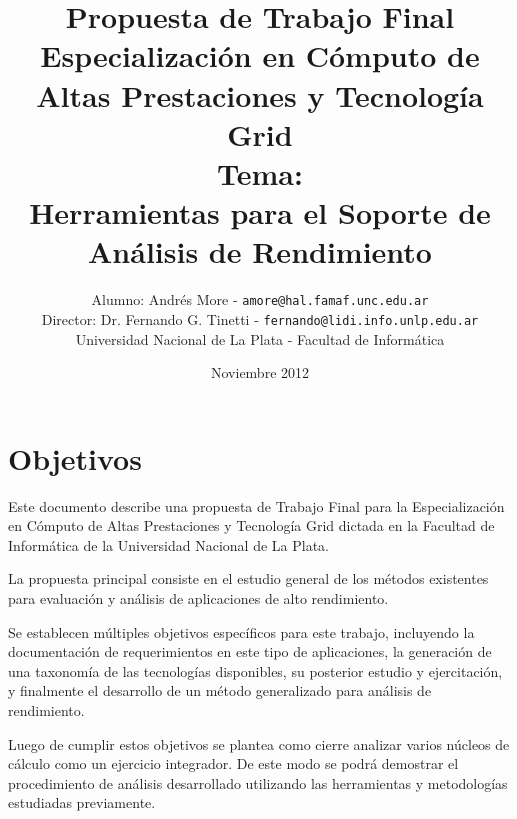 \documentclass[a4paper]{article}
\begin{document}
\title{Propuesta de Trabajo Final\\
\bigskip
Especializaci\'on en C\'omputo de Altas Prestaciones y Tecnolog\'ia Grid\\
\bigskip
Tema:\\
Herramientas para el Soporte de An\'alisis de Rendimiento}

\author{Alumno: Andr\'es More - {\tt amore@hal.famaf.unc.edu.ar}
\\Director: Dr. Fernando G. Tinetti - {\tt fernando@lidi.info.unlp.edu.ar}
\bigskip
\\Universidad Nacional de La Plata - Facultad de Inform\'atica}

\date{Noviembre 2012}

\maketitle

\newpage

\section{Objetivos}

  Este documento describe una propuesta de Trabajo Final para la
  Especializaci\'on en C\'omputo de Altas Prestaciones y Tecnolog\'ia Grid
  dictada en la Facultad de Inform\'atica de la Universidad Nacional de La
  Plata.

  \smallskip

  La propuesta principal consiste en el estudio general de los m\'etodos
  existentes para evaluaci\'on y an\'alisis de aplicaciones de alto
  rendimiento.

  \smallskip

  Se establecen m\'ultiples objetivos espec\'ificos para
  este trabajo, incluyendo la documentaci\'on de requerimientos en este
  tipo de aplicaciones, la generaci\'on de una taxonom\'ia de las
  tecnolog\'ias disponibles, su posterior estudio y ejercitaci\'on, y
  finalmente el desarrollo de un m\'etodo generalizado para an\'alisis de
  rendimiento.

  \smallskip

  Luego de cumplir estos objetivos se plantea como cierre analizar
  varios n\'ucleos de c\'alculo como un ejercicio integrador. De este modo
  se podr\'a demostrar el procedimiento de an\'alisis desarrollado
  utilizando las herramientas y metodolog\'ias estudiadas previamente.

  \smallskip
\end{document}
